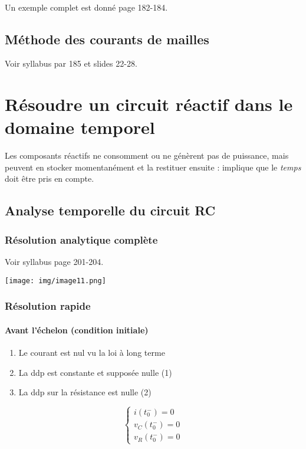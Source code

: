 \documentclass[british,french,11pt, a4paper, openany]{book}
\begin{document}
		\ \\
		Un exemple complet est donné page 182-184.
		
		\section{Méthode des courants de mailles}
		Voir syllabus par 185 et slides 22-28.
		\chapter{Résoudre un circuit réactif dans le domaine temporel}
		Les composants réactifs ne consomment ou ne génèrent pas de puissance, mais peuvent en stocker momentanément et la restituer ensuite : implique que le \textit{temps} doit être pris en compte.
		
		\setcounter{section}{1}
		\section{Analyse temporelle du circuit RC}
		\subsection{Résolution analytique complète}
		Voir syllabus page 201-204.
		\begin{center}
			\texttt{[image: img/image11.png]}
		\end{center}
		
		\subsection{Résolution rapide}
		\subsubsection{Avant l'échelon (condition initiale)}
		\begin{enumerate}
			\item Le courant est nul vu la loi à long terme
			\item La ddp est constante et supposée nulle (1)
			\item La ddp sur la résistance est nulle (2)
		\end{enumerate}
		\begin{equation}
		\left\{\begin{array}{l}
		i(t_0^-) = 0\\
		v_C(t_0^-) = 0\\
		v_R(t_0^-) = 0
		\end{array}\right.
		\end{equation}
		
\end{document}
